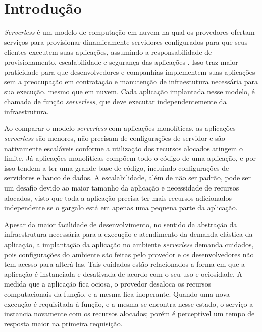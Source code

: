 \documentclass[conference]{IEEEtran}
\begin{document}

\section{Introdução}
\label{sec:Intro}

\textit{Serverless} é um modelo de computação em nuvem na qual os provedores ofertam serviços para provisionar  dinamicamente servidores configurados para que seus clientes executem suas aplicações, assumindo a responsabilidade de provisionamento, escalabilidade e segurança das aplicações \cite{Nupponen_2020_serverless_what_it_is}.
Isso traz maior praticidade para que desenvolvedores e companhias implementem suas aplicações sem a preocupação em contratação e manutenção de infraestutura necessária para sua execução, mesmo que em nuvem. 
Cada aplicação implantada nesse modelo, é chamada de função \textit{serverless}, que deve executar independentemente da infraestrutura.

Ao comparar o modelo \textit{serverless} com aplicações monolíticas, as aplicações \textit{serverless} são menores, não precisam de configurações de servidor e são nativamente escaláveis conforme a utilização dos recursos alocados atingem o limite. Já aplicações monolíticas compõem todo o código de uma aplicação, e por isso tendem a ter uma grande base de código, incluindo configurações de servidores e banco de dados. A escalabilidade, além de não ser padrão, pode ser um desafio devido ao maior tamanho da aplicação e necessidade de recursos alocados, visto que toda a aplicação precisa ter mais recursos adicionados independente se o gargalo está em apenas uma pequena parte da aplicação.



Apesar da maior facilidade de desenvolvimento, no sentido da abstração da infraestrutura necessária para a execução e atendimento da demanda elástica da aplicação, a implantação da aplicação no ambiente \textit{serverless} demanda cuidados, pois configurações do ambiente são feitas pelo provedor e os desenvolvedores não tem acesso para alterá-las. Tais cuidados estão relacionados a forma em que a aplicação é instanciada e desativada de acordo com o seu uso e ociosidade. A medida que a aplicação fica ociosa, o provedor desaloca os recursos computacionais da função, e a mesma fica inoperante. Quando uma nova execução é requisitada à função, e a mesma se encontra nesse estado, o serviço a instancia novamente com os recursos alocados; porém é perceptível um tempo de resposta maior na primeira requisição.   
\end{document}
